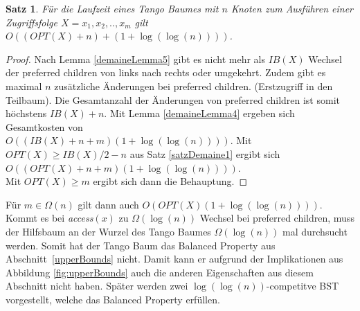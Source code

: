 \documentclass[a4paper,12pt]{article}
\newtheorem{Satz}{Satz}[section]
\begin{document}
\begin{Satz} \label{demaineSatz2}
	Für die Laufzeit eines Tango Baumes mit $n$ Knoten zum Ausführen einer Zugriffsfolge $X = x_1, x_2,.., x_m$ gilt $O\left(\left(\mathit{OPT}\left(X\right) + n\right)  + \left(  1 + \log\left(\log \left(n\right)\right)\right)   \right)$.
\end{Satz}
\begin{proof}
	Nach Lemma \ref{demaineLemma5} gibt es nicht mehr als  $\mathit{IB}\left(X\right)$ Wechsel der preferred children von links nach rechts oder umgekehrt. Zudem gibt es maximal $n$ zusätzliche Änderungen bei preferred children. (Erstzugriff in den Teilbaum). Die Gesamtanzahl der Änderungen von preferred children ist somit höchstens $\mathit{IB}\left(X\right) + n$. Mit Lemma \ref{demaineLemma4} ergeben sich Gesamtkosten von\\ $O\left(\left(\mathit{IB}\left(X\right) + n +m \right) \left( 1 + \log \left(\log\left(n\right)\right)\right) \right)$. Mit $\mathit{OPT}\left(X\right) \geq \mathit{IB}\left(X\right) /2 -n $ aus Satz \ref{satzDemaine1} ergibt sich 
	$O\left(\left(\mathit{OPT}\left(X\right) + n +m \right) \left( 1 + \log \left(\log\left(n\right)\right)\right) \right)$.\\ Mit $\mathit{OPT}\left(X\right) \geq m$ ergibt sich dann die Behauptung.
\end{proof}
\noindent Für $m \in \Omega\left(n\right)$ gilt dann auch 
$O\left(	\mathit{OPT}\left(X\right) 	\left( 1 + \log \left(\log \left(n\right)\right)\right)	 \right)$.\\
 Kommt es bei \textit{access}$\left(x\right)$ zu $\Omega\left(\log\left(n\right)\right)$ Wechsel bei preferred children, muss der Hilfsbaum an der Wurzel des Tango Baumes $\Omega\left(\log\left(n\right)\right)$ mal durchsucht werden. Somit hat der Tango Baum das Balanced Property aus \mbox{Abschnitt \ref{upperBounds}} nicht. Damit kann er aufgrund der Implikationen aus Abbildung \ref{fig:upperBounds} auch die anderen Eigenschaften aus diesem Abschnitt nicht haben. Später werden zwei $\log\left(\log\left(n\right)\right)$-competitve BST vorgestellt, welche das Balanced Property erfüllen.      
\end{document}
